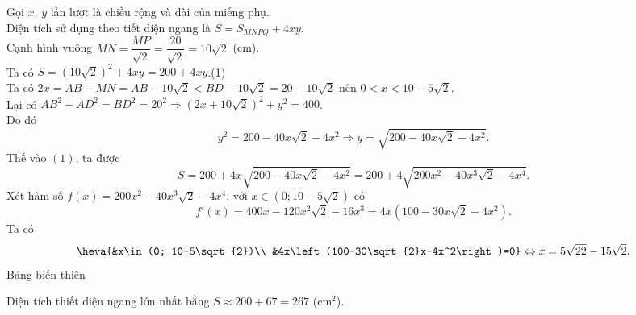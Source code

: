 \begin{bt}
{\begin{center}
\begin{tikzpicture}[scale=1.2, font=\footnotesize,line join=round, line cap=round, >=stealth]
		\end{tikzpicture}	
	\end{center}
	Gọi $x$, $y$ lần lượt là chiều rộng và dài của miếng phụ.\\
	Diện tích sử dụng theo tiết diện ngang là $S=S_{MNPQ}+4xy$.\\
	Cạnh hình vuông $M N=\dfrac{M P}{\sqrt{2}}=\dfrac{20}{\sqrt{2}}=10 \sqrt{2}$ (cm).\\
	Ta có $S=(10 \sqrt{2})^2+4xy=200+4 x y$.\qquad (1)\\
	Ta có $2 x=A B-M N=A B-10 \sqrt{2}<B D-10 \sqrt{2}=20-10 \sqrt{2}$ nên $0<x<10-5\sqrt{2}$.\\
	Lại có $A B^2+A D^2=B D^2=20^2 \Rightarrow(2 x+10 \sqrt{2})^2+y^2=400$.\\ Do đó
	$$
	y^2=200-40 x \sqrt{2}-4 x^2 \Rightarrow y=\sqrt{200-40 x \sqrt{2}-4 x^2}.
	$$
	Thế vào $(1)$, ta được 
	$$
	S=200+4 x \sqrt{200-40 x \sqrt{2}-4 x^2}=200+4 \sqrt{200 x^2-40 x^3 \sqrt{2}-4 x^4}.
	$$
	Xét hàm số $f(x)=200 x^2-40 x^3 \sqrt{2}-4 x^4$, với $x \in(0 ; 10-5\sqrt{2})$ có
	$$
	f'(x)=400 x-120 x^2 \sqrt{2}-16 x^3=4x\left(100-30x\sqrt{2}-4x^2\right).
	$$
	Ta có \[\heva{&x\in (0; 10-5\sqrt{2})\\ &4x\left(100-30\sqrt{2}x-4x^2\right)=0}\Leftrightarrow x=5 \sqrt{22}-15 \sqrt{2}.\]
	Bảng biến thiên
	\begin{center}
	\end{center}
	Diện tích thiết diện ngang lớn nhất bằng $S\approx 200+67=267$ (cm$^2$).
	}
\end{bt}

